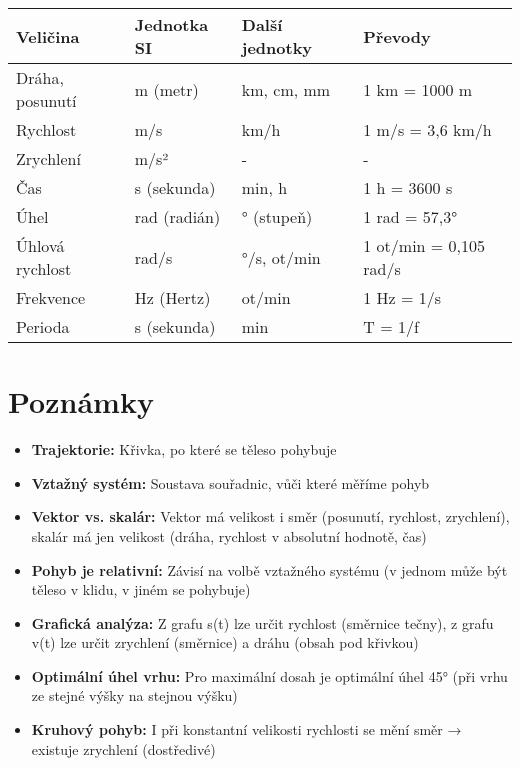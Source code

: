 \documentclass[11pt,a4paper]{article}
\begin{document}
\begin{longtable}{llll}
\toprule
Veličina & Jednotka SI & Další jednotky & Převody \\
\midrule
Dráha, posunutí & m (metr) & km, cm, mm & 1 km = 1000 m \\
Rychlost & m/s & km/h & 1 m/s = 3,6 km/h \\
Zrychlení & m/s² & - & - \\
Čas & s (sekunda) & min, h & 1 h = 3600 s \\
Úhel & rad (radián) & ° (stupeň) & 1 rad = 57,3° \\
Úhlová rychlost & rad/s & °/s, ot/min & 1 ot/min = 0,105 rad/s \\
Frekvence & Hz (Hertz) & ot/min & 1 Hz = 1/s \\
Perioda & s (sekunda) & min & T = 1/f \\
\bottomrule
\end{longtable}

\clearpage

\section*{Poznámky}

\begin{itemize}
\item \textbf{Trajektorie:} Křivka, po které se těleso pohybuje
\item \textbf{Vztažný systém:} Soustava souřadnic, vůči které měříme pohyb
\item \textbf{Vektor vs. skalár:} Vektor má velikost i směr (posunutí, rychlost, zrychlení), skalár má jen velikost (dráha, rychlost v absolutní hodnotě, čas)
\item \textbf{Pohyb je relativní:} Závisí na volbě vztažného systému (v jednom může být těleso v klidu, v jiném se pohybuje)
\item \textbf{Grafická analýza:} Z grafu s(t) lze určit rychlost (směrnice tečny), z grafu v(t) lze určit zrychlení (směrnice) a dráhu (obsah pod křivkou)
\item \textbf{Optimální úhel vrhu:} Pro maximální dosah je optimální úhel 45° (při vrhu ze stejné výšky na stejnou výšku)
\item \textbf{Kruhový pohyb:} I při konstantní velikosti rychlosti se mění směr → existuje zrychlení (dostředivé)
\end{itemize}
\end{document}
